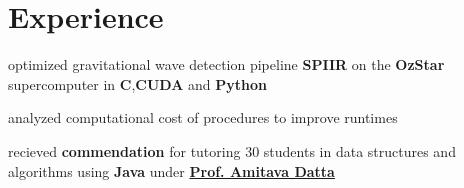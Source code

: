 \documentclass[a4paper]{style}
\begin{document}
\begin{minipage}[t]{0.5\textwidth}

\vspace{-1.5em}
\section{Experience}

\vspace{-0.8em}
\begin{tightitemize}
    \item optimized gravitational wave detection pipeline \textbf{SPIIR} on the \textbf{OzStar} supercomputer in \textbf{C},\textbf{CUDA} and \textbf{Python}
    \item analyzed computational cost of procedures to improve runtimes
\end{tightitemize}
\vspace{-1pt}
\sectionspace{}

    \vspace{-1pt}
    \begin{tightitemize}
        \item recieved \textbf{commendation} for tutoring 30 students in data structures and algorithms using \textbf{Java} under \href{https://research-repository.uwa.edu.au/en/persons/amitava-datta}{\textbf{Prof. Amitava Datta}}
    \end{tightitemize}
\sectionspace{}


\end{minipage}
\end{document}
